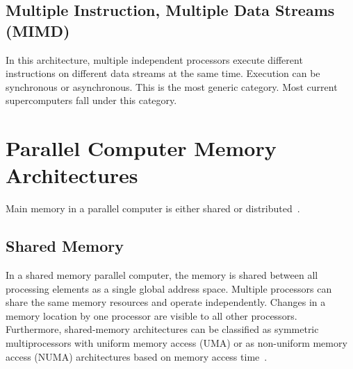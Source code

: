 \subsection{Multiple Instruction, Multiple Data Streams (MIMD)}
    In this architecture, multiple independent processors execute different instructions on different data streams at the same time. Execution can be synchronous or asynchronous. This is the most generic category. Most current supercomputers fall under this category.


\section{Parallel Computer Memory Architectures}
Main memory in a parallel computer is either shared or distributed~\cite{patterson2013computer}.

\subsection{Shared Memory}
In a shared memory parallel computer, the memory is shared between all processing elements as a single global address space. Multiple processors can share the same memory resources and operate independently. Changes in a memory location by one processor are visible to all other processors.\\ 
Furthermore, shared-memory architectures can be classified as symmetric multiprocessors with uniform memory access (UMA) or as non-uniform memory access (NUMA) architectures based on memory access time~\cite{kshemkalyani2008distributed,sutter2005free}.

